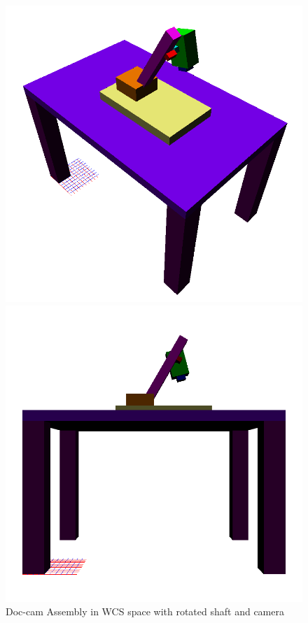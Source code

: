 \documentclass[12pt]{article}
\begin{document}
        \begin{figure}[H]
            \begin{minipage}[b]{0.5\linewidth}
                \centering
                \includegraphics[width=\linewidth]{../images/assembly_smooth_tilt_1.png}
            \end{minipage}%
            \begin{minipage}[b]{0.5\linewidth}
                \centering
                \includegraphics[width=\linewidth]{../images/assembly_smooth_tilt_2.png}
            \end{minipage}
            \caption{Doc-cam Assembly in WCS space with rotated shaft and camera}
        \end{figure}
\end{document}
